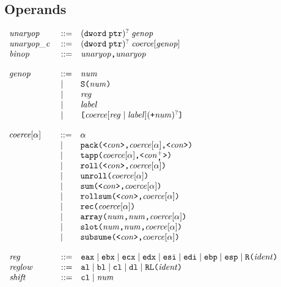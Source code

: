 \documentclass{article}
\newenvironment{gramrule}
  {\begin{flushleft}$\begin{array}{p{0.7in}ll}}
  {\end{array}$\end{flushleft}}
\newcommand{\nterm}[1]{{\it#1}}
\newcommand{\term}[1]{{\it#1}}
\newcommand{\ts}[1]{\hbox{\tt#1}}
\newcommand{\alt}{\mathrel{|}}
\begin{document}
\subsection{Operands}
\begin{gramrule}
\nterm{unaryop} &::=& (\ts{dword} \; \ts{ptr})^? \; \nterm{genop} \\
\nterm{unaryop\_c} &::=& (\ts{dword} \; \ts{ptr})^? \;
    \nterm{coerce}[\nterm{genop}] \\
\nterm{binop} &::=& \nterm{unaryop} \ts{,} \nterm{unaryop} \\
\end{gramrule}
\begin{gramrule}
\nterm{genop} &::=& \term{num} \\
&|& \ts{S} \ts{(} \term{num} \ts{)} \\
&|& \nterm{reg} \\
&|& \nterm{label} \\
&|& \ts{[} \nterm{coerce}[\nterm{reg}\alt\nterm{label}] (\ts{+} \term{num})^?
    \ts{]}
\end{gramrule}
\begin{gramrule}
\nterm{coerce}\hbox{$[\alpha]$} &::=& \alpha \\
&|& \ts{pack} \ts{(} \ts{<} \nterm{con} \ts{>} \ts{,} \nterm{coerce}[\alpha]
    \ts{,} \ts{<} \nterm{con} \ts{>} \ts{)} \\
&|& \ts{tapp} \ts{(} \nterm{coerce}[\alpha] \ts{,} \ts{<}
    \nterm{con}^+_{\ts{,}} \ts{>} \ts{)} \\
&|& \ts{roll} \ts{(} \ts{<} \nterm{con} \ts{>} \ts{,} \nterm{coerce}[\alpha]
    \ts{)} \\
&|& \ts{unroll} \ts{(} \nterm{coerce}[\alpha] \ts{)} \\
&|& \ts{sum} \ts{(} \ts{<} \nterm{con} \ts{>} \ts{,} \nterm{coerce}[\alpha]
    \ts{)} \\
&|& \ts{rollsum} \ts{(} \ts{<} \nterm{con} \ts{>} \ts{,} \nterm{coerce}[\alpha]
    \ts{)} \\
&|& \ts{rec} \ts{(} \nterm{coerce}[\alpha] \ts{)} \\
&|& \ts{array} \ts{(} \term{num} \ts{,} \term{num} \ts{,}
    \nterm{coerce}[\alpha] \ts{)} \\
&|& \ts{slot} \ts{(} \term{num} \ts{,} \term{num} \ts{,}
    \nterm{coerce}[\alpha] \ts{)} \\
&|& \ts{subsume} \ts{(} \ts{<} \nterm{con} \ts{>} \ts{,} \nterm{coerce}[\alpha]
    \ts{)} \\
\end{gramrule}
\begin{gramrule}
\nterm{reg} &::=& \ts{eax} \alt \ts{ebx} \alt \ts{ecx} \alt \ts{edx} \alt
   \ts{esi} \alt \ts{edi} \alt \ts{ebp} \alt \ts{esp} \alt \ts{R} \ts{(}
   \term{ident} \ts{)} \\
\nterm{reglow} &::=& \ts{al} \alt \ts{bl} \alt \ts{cl} \alt \ts{dl} \alt 
   \ts{RL} \ts{(} \term{ident} \ts{)} \\
\nterm{shift} &::=& \ts{cl} \alt \term{num}
\end{gramrule}
\end{document}
